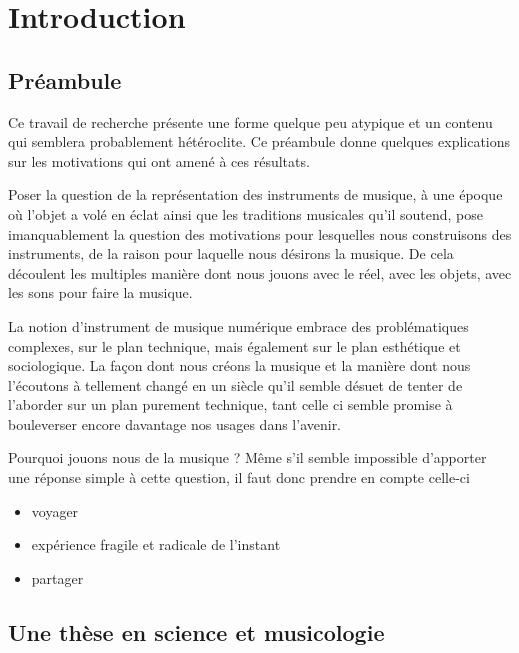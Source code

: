 %
\chapter{Introduction}
\label{ch:introduction}
%

\section{Préambule}

Ce travail de recherche présente une forme quelque peu atypique et un contenu qui semblera probablement hétéroclite. Ce préambule donne quelques explications sur les motivations qui ont amené à ces résultats.

Poser la question de la représentation des instruments de musique, à une époque où l’objet a volé en éclat ainsi que les traditions musicales qu’il soutend, pose imanquablement la question des motivations pour lesquelles nous construisons des instruments, de la raison pour laquelle nous désirons la musique. De cela découlent les multiples manière dont nous jouons avec le réel, avec les objets, avec les sons pour faire la musique.

La notion d’instrument de musique numérique embrace des problématiques complexes, sur le plan technique, mais également sur le plan esthétique et sociologique. La façon dont nous créons la musique et la manière dont nous l’écoutons à tellement changé en un siècle qu’il semble désuet de tenter de l’aborder sur un plan purement technique, tant celle ci semble promise à bouleverser encore davantage nos usages dans l’avenir.

Pourquoi jouons nous de la musique ?
Même s’il semble impossible d’apporter une réponse simple à cette question, il faut donc prendre en compte celle-ci 

\vspace{-1em}
\begin{itemize}[noitemsep]
\item voyager
\item expérience fragile et radicale de l’instant
\item partager
\end{itemize}

\section{Une thèse en science et musicologie}

